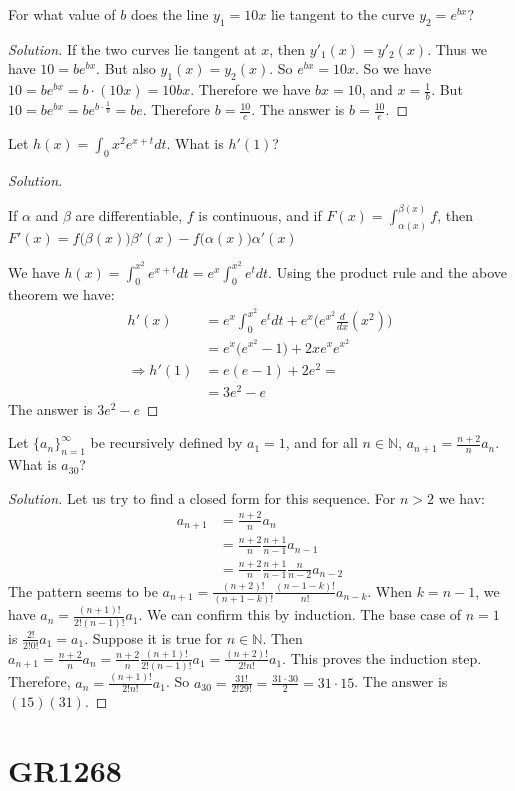 \documentclass[crop=false,class=book,oneside]{standalone}
\begin{document}
\begin{problem}
For what value of $b$ does the line $y_1=10x$ lie tangent to the curve $y_2=e^{bx}$?
\end{problem}
\begin{proof}[Solution]
If the two curves lie tangent at $x$, then $y'_1(x) = y'_2(x)$. Thus we have $10 = be^{bx}$. But also $y_1(x) = y_2(x)$. So $e^{bx} = 10x$. So we have $10 = be^{bx} = b\cdot (10x) = 10bx$. Therefore we have $bx = 10$, and $x = \frac{1}{b}$. But $10 = b e^{bx} = b e^{b\cdot \frac{1}{b}} = be$. Therefore $b = \frac{10}{e}$. The answer is $b = \frac{10}{e}$.
\end{proof}
\begin{problem}
Let $h(x)=\int_{0}{x^{2}}e^{x+t}dt$. What is $h'(1)$?
\end{problem}
\begin{proof}[Solution]
\begin{theorem*}
If $\alpha$ and $\beta$ are differentiable, $f$ is continuous, and if $F(x) = \int_{\alpha(x)}^{\beta(x)}f$, then $F'(x) = f\big(\beta(x)\big)\beta'(x) - f\big(\alpha(x)\big)\alpha'(x)$
\end{theorem*}
We have $h(x) = \int_{0}^{x^2}e^{x+t}dt = e^x \int_{0}^{x^2}e^t dt$. Using the product rule and the above theorem we have:
\begin{align*}
    h'(x) &= e^x \int_{0}^{x^2} e^t dt + e^{x} \big(e^{x^2}\frac{d}{dx}(x^2)\big) \\
    &= e^x\big(e^{x^2}-1\big) + 2xe^xe^{x^2} \\
    \Rightarrow h'(1) &= e(e-1) + 2e^2 = \\
    &= 3e^2 - e
\end{align*}
The answer is $3e^{2}-e$
\end{proof}
\begin{problem}
Let $\{a_n\}_{n=1}^{\infty}$ be recursively defined by $a_1 = 1$, and for all $n\in \mathbb{N}$, $a_{n+1} = \frac{n+2}{n}a_n$. What is $a_{30}$?
\end{problem}
\begin{proof}[Solution]
Let us try to find a closed form for this sequence. For $n>2$ we hav:
\begin{align*}
    a_{n+1} &= \frac{n+2}{n}a_n \\
    &= \frac{n+2}{n}\frac{n+1}{n-1}a_{n-1}\\
    &= \frac{n+2}{n}\frac{n+1}{n-1}\frac{n}{n-2}a_{n-2}
\end{align*}
The pattern seems to be $a_{n+1} = \frac{(n+2)!}{(n+1-k)!}\frac{(n-1-k)!}{n!}a_{n-k}$. When $k=n-1$, we have $a_{n} = \frac{(n+1)!}{2!(n-1)!}a_1$. We can confirm this by induction. The base case of $n=1$ is $\frac{2!}{2!0!}a_1 = a_1$. Suppose it is true for $n\in \mathbb{N}$. Then $a_{n+1} = \frac{n+2}{n} a_n = \frac{n+2}{n} \frac{(n+1)!}{2!(n-1)!}a_1 = \frac{(n+2)!}{2!n!}a_1$. This proves the induction step. Therefore, $a_n = \frac{(n+1)!}{2!n!}a_1$. So $a_{30} = \frac{31!}{2!29!} = \frac{31\cdot 30}{2} = 31\cdot 15$. The answer is $(15)(31)$.
\end{proof}
\section{GR1268}
\end{document}
